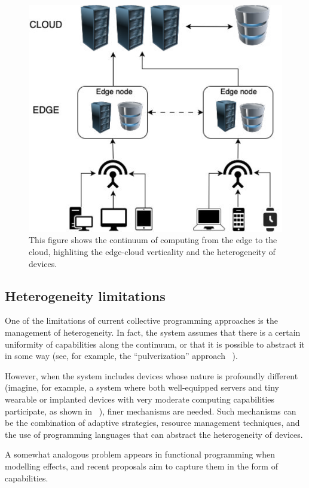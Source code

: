 \begin{figure}
    \centering
    \includegraphics[width=.5\linewidth]{figures/edge-cloud}
    \caption{This figure shows the continuum of computing from the edge to the cloud, highliting the edge-cloud verticality
    and the heterogeneity of devices.}
    \label{fig:cloud-edge-continuum}
\end{figure}

\subsection{Heterogeneity limitations}
\label{subsec:heterogeneity-limitations}

One of the limitations of current collective programming approaches is the management of heterogeneity.
In fact, the system assumes that there is a certain uniformity of capabilities along the continuum, or that it is possible
to abstract it in some way (see, for example, the ``pulverization'' approach ~\cite{fi12110203}).

However, when the system includes devices whose nature is profoundly different (imagine, for example, a system where both
well-equipped servers and tiny wearable or implanted devices with very moderate computing capabilities participate, as
shown in ~), finer mechanisms are needed.
Such mechanisms can be the combination of adaptive strategies, resource management techniques, and the use of programming
languages that can abstract the heterogeneity of devices.

A somewhat analogous problem appears in functional programming when modelling effects, and recent proposals aim to capture
them in the form of capabilities.

